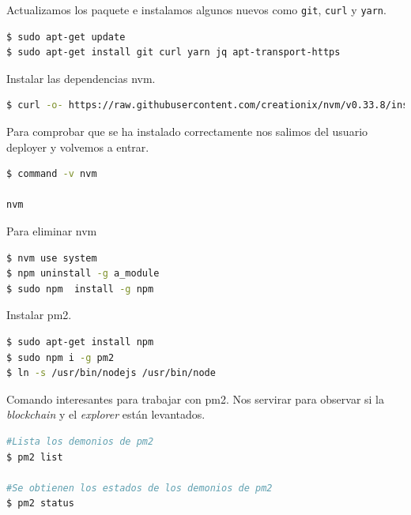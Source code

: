 Actualizamos los paquete e instalamos algunos nuevos como \texttt{git}, \texttt{curl} y \texttt{yarn}.\\

\begin{lstlisting}[language=Bash,caption=Instalación \textit{blockchain}. Parte IV, label=cod:suma-cuerpo, style=Consola]
$ sudo apt-get update
$ sudo apt-get install git curl yarn jq apt-transport-https
\end{lstlisting}

Instalar las dependencias nvm.\\

\begin{lstlisting}[language=Bash,caption=Instalación \textit{blockchain}. Parte V, label=cod:suma-cuerpo, style=Consola]
$ curl -o- https://raw.githubusercontent.com/creationix/nvm/v0.33.8/install.sh | bash
\end{lstlisting}

Para comprobar que se ha instalado correctamente nos salimos del usuario deployer y volvemos a entrar.\\

\begin{lstlisting}[language=Bash,caption=Instalación \textit{blockchain}. Parte VI, label=cod:suma-cuerpo, style=Consola]
$ command -v nvm

nvm
\end{lstlisting}

Para eliminar nvm
\begin{lstlisting}[language=Bash,caption=Instalación \textit{blockchain}. Parte VII, label=cod:suma-cuerpo, style=Consola]
$ nvm use system
$ npm uninstall -g a_module
$ sudo npm  install -g npm
\end{lstlisting}

Instalar pm2.\\

\begin{lstlisting}[language=Bash,caption=Instalación \textit{blockchain}. Parte VIII, label=cod:suma-cuerpo, style=Consola]
$ sudo apt-get install npm
$ sudo npm i -g pm2
$ ln -s /usr/bin/nodejs /usr/bin/node
\end{lstlisting}

Comando interesantes para trabajar con pm2. Nos servirar para observar si la \textit{blockchain} y el \textit{explorer} están levantados.

\begin{lstlisting}[language=Bash,caption=Comandos útiles de pm2, label=cod:suma-cuerpo, style=Consola]
#Lista los demonios de pm2
$ pm2 list

#Se obtienen los estados de los demonios de pm2
$ pm2 status
\end{lstlisting}

